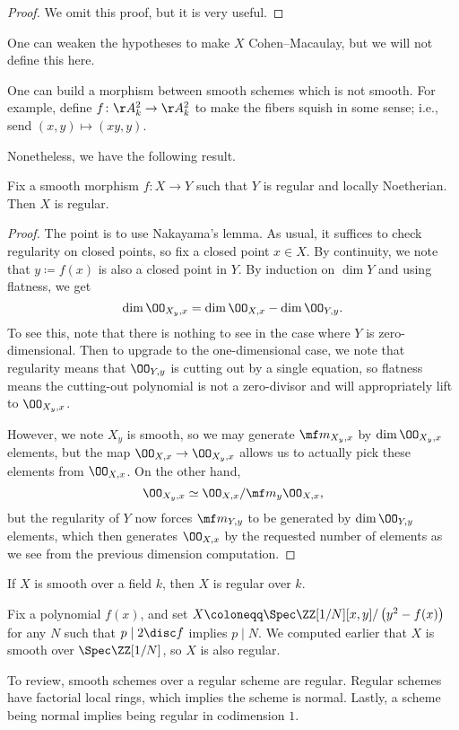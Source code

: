 \documentclass[../notes.tex]{subfiles}
\begin{document}
\begin{proof}
	We omit this proof, but it is very useful.
\end{proof}
\begin{remark}
	One can weaken the hypotheses to make $X$ Cohen--Macaulay, but we will not define this here.
\end{remark}
\begin{nex}
	One can build a morphism between smooth schemes which is not smooth. For example, define $f\colon\AA^2_k\to\AA^2_k$ to make the fibers squish in some sense; i.e., send $(x,y)\mapsto(xy,y)$.
\end{nex}
Nonetheless, we have the following result.
\begin{proposition}
	Fix a smooth morphism $f\colon X\to Y$ such that $Y$ is regular and locally Noetherian. Then $X$ is regular.
\end{proposition}
\begin{proof}
	The point is to use Nakayama's lemma. As usual, it suffices to check regularity on closed points, so fix a closed point $x\in X$. By continuity, we note that $y\coloneqq f(x)$ is also a closed point in $Y$. By induction on $\dim Y$ and using flatness, we get
	\[\dim\OO_{X_y,x}=\dim\OO_{X,x}-\dim\OO_{Y,y}.\]
	To see this, note that there is nothing to see in the case where $Y$ is zero-dimensional. Then to upgrade to the one-dimensional case, we note that regularity means that $\OO_{Y,y}$ is cutting out by a single equation, so flatness means the cutting-out polynomial is not a zero-divisor and will appropriately lift to $\OO_{X_y,x}$.

	However, we note $X_y$ is smooth, so we may generate $\mf m_{X_y,x}$ by $\dim\OO_{X_y,x}$ elements, but the map $\OO_{X,x}\to\OO_{X_y,x}$ allows us to actually pick these elements from $\OO_{X,x}$. On the other hand,
	\[\OO_{X_y,x}\simeq\OO_{X,x}/\mf m_y\OO_{X,x},\]
	but the regularity of $Y$ now forces $\mf m_{Y,y}$ to be generated by $\dim\OO_{Y,y}$ elements, which then generates $\OO_{X,x}$ by the requested number of elements as we see from the previous dimension computation.
\end{proof}
\begin{example}
	If $X$ is smooth over a field $k$, then $X$ is regular over $k$.
\end{example}
\begin{example}
	Fix a polynomial $f(x)$, and set $X\coloneqq\Spec\ZZ[1/N][x,y]/\left(y^2-f(x)\right)$ for any $N$ such that $p\mid2\disc f$ implies $p\mid N$. We computed earlier that $X$ is smooth over $\Spec\ZZ[1/N]$, so $X$ is also regular.
\end{example}
\begin{remark}
	To review, smooth schemes over a regular scheme are regular. Regular schemes have factorial local rings, which implies the scheme is normal. Lastly, a scheme being normal implies being regular in codimension $1$.
\end{remark}
\end{document}
